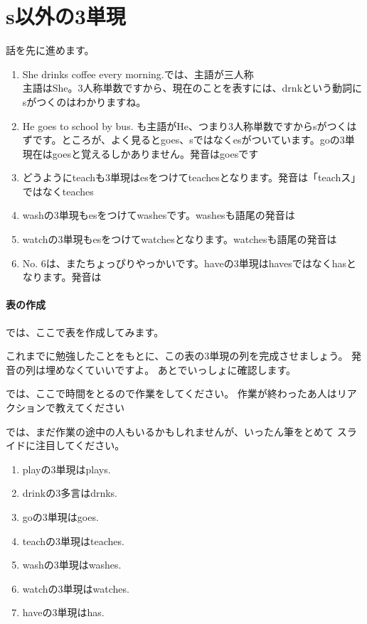 \documentclass[book,jafontscale=0.9247]{jlreq}
\newcommand{\mySagyo}{%
\par%
\bigskip
では、ここで時間をとるので作業をしてください。
作業が終わったあ人はリアクションで教えてください\par%
\begin{minipage}[t]{.98\textwidth}
\mbox{}\hrulefill\mbox{}\par%
\mbox{}\hfill{}\raisebox{-.5\height}{作業}\hfill\mbox{}\par%
\mbox{}\hrulefill\mbox{}
\end{minipage}%
\par%
\bigskip%
では、まだ作業の途中の人もいるかもしれませんが、いったん筆をとめて
スライドに注目してください。%
\par%
\bigskip
}
\begin{document}
\newpage
\section{s以外の3単現}

話を先に進めます。

\begin{enumerate}
 \item She drinks coffee every morning.では、主語が三人称\\
主語はShe。3人称単数ですから、現在のことを表すには、drnkという動詞にsがつくのはわかりますね。
 \item He goes to school by bus. も主語がHe、つまり3人称単数ですからsがつくはずです。ところが、よく見るとgoes、sではなくesがついています。goの3単現在はgoesと覚えるしかありません。発音はgoesです
 \item どうようにteachも3単現はesをつけてteachesとなります。発音は「teachス」ではなくteaches
 \item washの3単現もesをつけてwashesです。washesも語尾の発音は
 \item watchの3単現もesをつけてwatchesとなります。watchesも語尾の発音は
 \item No. 6は、またちょっぴりやっかいです。haveの3単現はhavesではなくhasとなります。発音は
\end{enumerate}

\paragraph{表の作成}

では、ここで表を作成してみます。

これまでに勉強したことをもとに、この表の3単現の列を完成させましょう。
発音の列は埋めなくていいですよ。
あとでいっしょに確認します。

\mySagyo

\begin{enumerate}
 \item playの3単現はplays.
 \item drinkの3多言はdrnks.
 \item goの3単現はgoes.
 \item teachの3単現はteaches.
 \item washの3単現はwashes.
 \item watchの3単現はwatches.
 \item haveの3単現はhas.
\end{enumerate}
\end{document}
